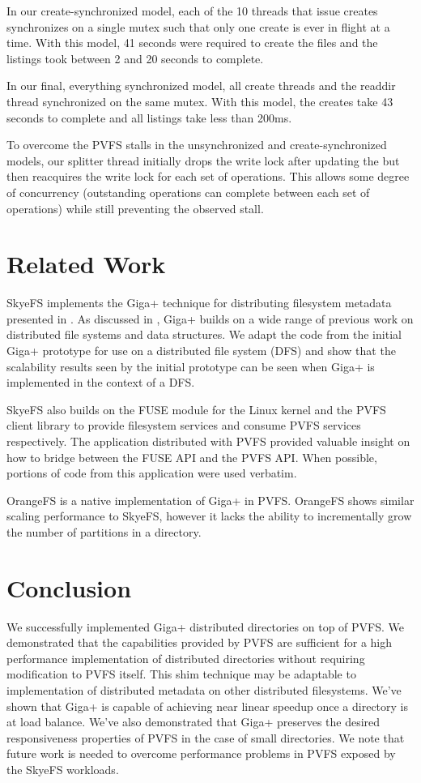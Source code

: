 \documentclass[onecolumn, 11pt, letterpaper]{article}
\begin{document}
In our create-synchronized model, each of the 10 threads that issue creates
synchronizes on a single mutex such that only one create is ever in flight at
a time.  With this model, 41 seconds were required to create the files and the
listings took between 2 and 20 seconds to complete.

In our final, everything synchronized model, all create threads and the
readdir thread synchronized on the same mutex.  With this model, the creates
take 43 seconds to complete and all listings take less than 200ms.

To overcome the PVFS stalls in the unsynchronized and create-synchronized
models, our splitter thread initially drops the write lock after updating the
 but then reacquires the write lock for each set of
 operations.  This allows some degree of concurrency
(outstanding operations can complete between each set of operations) while
still preventing the observed stall.
\section{Related Work}
SkyeFS implements the Giga+ technique for distributing filesystem metadata
presented in \cite{gigaplus}.  As discussed in \cite{gigaplus}, Giga+ builds
on a wide range of previous work on distributed file systems and data
structures.  We adapt the code from the initial Giga+ prototype for use on a
distributed file system (DFS) and show that the scalability results seen by
the initial prototype can be seen when Giga+ is implemented in the context of
a DFS.

SkyeFS also builds on the FUSE module for the Linux kernel and the PVFS client
library to provide filesystem services and consume PVFS services respectively.
The  application distributed with PVFS provided valuable
insight on how to bridge between the FUSE API and the PVFS API.  When
possible, portions of code from this application were used verbatim.

OrangeFS is a native implementation of Giga+ in PVFS.\cite{orange}  OrangeFS
shows similar scaling performance to SkyeFS, however it lacks the ability to
incrementally grow the number of partitions in a directory.

\section{Conclusion}
We successfully implemented Giga+ distributed directories on top of PVFS.  We
demonstrated that the capabilities provided by PVFS are sufficient for a high
performance implementation of distributed directories without requiring
modification to PVFS itself.  This shim technique may be adaptable to
implementation of distributed metadata on other distributed filesystems.
We've shown that Giga+ is capable of achieving near linear speedup once a
directory is at load balance.  We've also demonstrated that Giga+ preserves
the desired responsiveness properties of PVFS in the case of small
directories.  We note that future work is needed to overcome performance
problems in PVFS exposed by the SkyeFS workloads.
\end{document}
